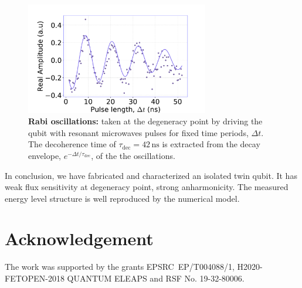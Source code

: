 \documentclass[%
reprint,
superscriptaddress,
bibnotes,
amsmath,
amssymb,
aps,
showkeys,
prb,
]{revtex4-1}
\newcommand{\iunit}[2]{\ensuremath{#1\,\text{#2}}}
\begin{document}
\begin{figure}
  \includegraphics[width=8cm]{fig5}
  \caption{\textbf{Rabi oscillations:}  taken at  the degeneracy point  by driving  the qubit
    with resonant microwaves pulses for fixed time periods, $ \Delta t $.  The decoherence time of
    $   \tau_{\text{dec}}  =   \iunit{42}{ns}  $   is   extracted  from   the  decay   envelope,
    $ e^{-\Delta t/\tau_{\text{dec}}} $, of the the oscillations. \label{fig:rabi}}
\end{figure}

In conclusion, we  have fabricated and  characterized an isolated  twin qubit.  It  has weak
flux  sensitivity at degeneracy  point, strong anharmonicity. The measured energy level structure is well reproduced by the numerical model.

\section*{Acknowledgement}
\noindent The work was supported by the grants EPSRC~EP/T004088/1, H2020-FETOPEN-2018 QUANTUM ELEAPS and RSF No. 19-32-80006.


\end{document}
